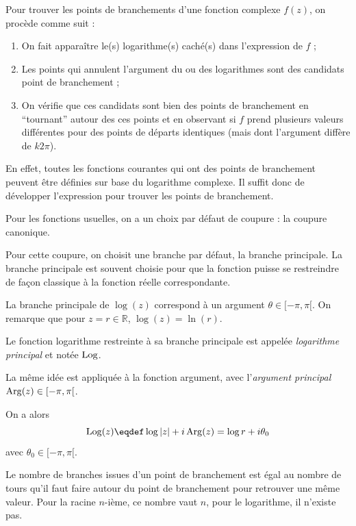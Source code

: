 \begin{myrem}
	Pour trouver les points de branchements d'une fonction complexe
	$f(z)$, on procède comme suit :
	\begin{enumerate}
		\item On fait apparaître le(s) logarithme(s) caché(s) dans
		l'expression de $f$ ;
		\item	Les points qui annulent l'argument du ou des logarithmes
		sont des candidats point de branchement ;
		\item On vérifie que ces candidats sont bien des points
		de branchement en ``tournant'' autour des ces points
		et en observant si $f$ prend plusieurs valeurs différentes
		pour des points de départs identiques (mais dont l'argument
		diffère de $k2\pi$).
	\end{enumerate}
	En effet, toutes les fonctions courantes qui ont des points
	de branchement peuvent être définies sur base du logarithme complexe.
	Il suffit donc de développer l'expression pour trouver les points
	de branchement.
\end{myrem}

\begin{mydef}
    Pour les fonctions usuelles, on a un choix par défaut
    de coupure : la coupure canonique.

    Pour cette coupure, on choisit une branche par défaut,
    la branche principale. La branche principale est souvent choisie
    pour que la fonction puisse se restreindre de façon classique à la
    fonction réelle correspondante.
\end{mydef}

\begin{myrem}
    La branche principale de $\log(z)$ correspond à un argument
    $\theta\in [-\pi, \pi[$. On remarque que pour $z = r \in \mathbb{R}$,
    $\log(z) = \ln(r)$.

    Le fonction logarithme restreinte à sa branche principale est
    appelée \emph{logarithme principal} et notée $\operatorname{Log}$.

    La même idée est appliquée à la fonction argument,
    avec l'\emph{argument principal} $\operatorname{Arg}(z) \in [-\pi, \pi[$.

    On a alors
    \[\Log(z) \eqdef \log|z| + i\Arg(z) = \log r + i\theta_0\]
    avec $\theta_0 \in [-\pi,\pi[$.
\end{myrem}

Le nombre de branches issues d'un point de branchement est égal au
nombre de tours qu'il faut faire autour du point de branchement pour
retrouver une même valeur. Pour la racine $n$-ième, ce nombre vaut $n$,
pour le logarithme, il n'existe pas.

